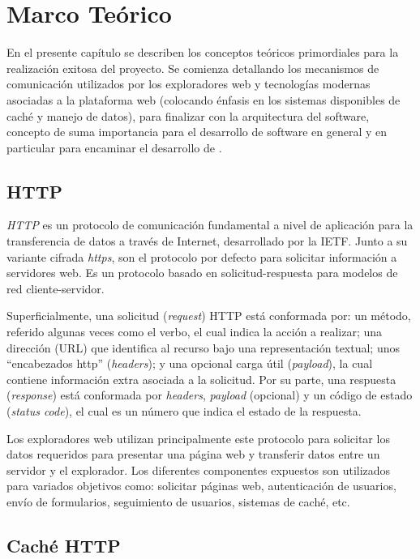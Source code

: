 \chapter{Marco Teórico}

En el presente capítulo se describen los conceptos teóricos primordiales para la realización exitosa del proyecto. Se comienza detallando los mecanismos de comunicación utilizados por los exploradores web y tecnologías modernas asociadas a la plataforma web (colocando énfasis en los sistemas disponibles de caché y manejo de datos), para finalizar con la arquitectura del software, concepto de suma importancia para el desarrollo de software en general y en particular para encaminar el desarrollo de \pwas.

\section{HTTP}

\textit{HTTP} es un protocolo de comunicación fundamental a nivel de aplicación para la transferencia de datos a través de Internet, desarrollado por la IETF. Junto a su variante cifrada \textit{https}, son el protocolo por defecto para solicitar información a servidores web. Es un protocolo basado en solicitud-respuesta para modelos de red cliente-servidor.

Superficialmente, una solicitud (\textit{request}) HTTP está conformada por: un método, referido algunas veces como el verbo, el cual indica la acción a realizar; una dirección (URL) que identifica al recurso bajo una representación textual; unos ``encabezados http'' (\textit{headers}); y una opcional carga útil (\textit{payload}), la cual contiene información extra asociada a la solicitud. Por su parte, una respuesta (\textit{response}) está conformada por \textit{headers}, \textit{payload} (opcional) y un código de estado (\textit{status code}), el cual es un número que indica el estado de la respuesta.

Los exploradores web utilizan principalmente este protocolo para solicitar los datos requeridos para presentar una página web y transferir datos entre un servidor y el explorador. Los diferentes componentes expuestos son utilizados para variados objetivos como: solicitar páginas web, autenticación de usuarios, envío de formularios, seguimiento de usuarios, sistemas de caché, etc.

\section{Caché HTTP}

